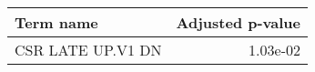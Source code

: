 \begin{tabular}{lr}
\toprule
        Term name &  Adjusted p-value \\
\midrule
CSR LATE UP.V1 DN &          1.03e-02 \\
\bottomrule
\end{tabular}
